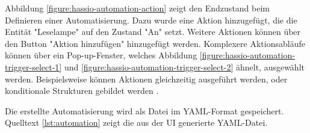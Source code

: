 Abbildung \ref{figure:hassio-automation-action} zeigt den Endzustand beim Definieren einer
Automatisierung. Dazu wurde eine Aktion hinzugefügt, die die Entität "Leselampe" auf den Zustand
"An" setzt. Weitere Aktionen können über den Button "Aktion hinzufügen" hinzugefügt werden.
Komplexere Aktionsabläufe können über ein Pop-up-Fenster, welches Abbildung
\ref{figure:hassio-automation-trigger-select-1} und \ref{figure:hassio-automation-trigger-select-2}
ähnelt, ausgewählt werden. Beispielsweise können Aktionen gleichzeitig ausgeführt werden, oder
konditionale Strukturen gebildet werden \parencite{homeassistantScriptSyntax}.



Die erstellte Automatisierung wird als Datei im \ac{YAML}-Format gespeichert. Quelltext
\ref{lst:automation} zeigt die aus der UI generierte \ac{YAML}-Datei. 
